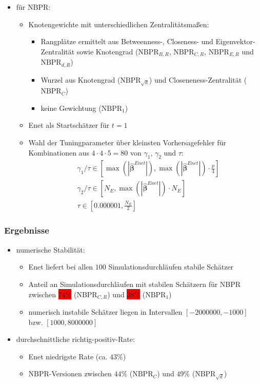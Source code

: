 \documentclass{beamer}
\begin{document}
\begin{frame}
	\begin{itemize}
	\item für $\text{NBPR}$:
	\begin{itemize}
	\item Knotengewichte mit unterschiedlichen Zentralitätsmaßen:
	\begin{itemize}
	\item Rangplätze ermittelt aus Betweenness-, Closeness- und Eigenvektor-Zentralität sowie Knotengrad ($\text{NBPR}_{B,R}$, $\text{NBPR}_{C,R}$, $\text{NBPR}_{E,R}$ und $\text{NBPR}_{d,R}$)
	\item Wurzel aus Knotengrad ($\text{NBPR}_{\sqrt{d}}$) und Closeneness-Zentralität ($\text{NBPR}_{C}$)
	\item keine Gewichtung ($\text{NBPR}_{1}$)
	\end{itemize}
	\item Enet als Startschätzer für $t=1$
	\item Wahl der Tuningparameter über kleinsten Vorhersagefehler für Kombinationen aus $4\cdot 4 \cdot 5 =80$ von $\gamma_1$, $\gamma_2$ und $\tau$:
	\begin{align*}
	&\gamma_1/\tau \in \left[ \max(|\boldsymbol{\hat{\beta}}^{Enet}|), \max(|\boldsymbol{\hat{\beta}}^{Enet}|) \cdot \frac{p}{4} \right] \\
	&\gamma_2/\tau \in \left[ N_E, \max(|\boldsymbol{\hat{\beta}}^{Enet}|) \cdot N_E \right]\\
	&\tau \in \left[0.000001, \frac{N_E}{2}\right]
	\end{align*}
	\end{itemize}
	\end{itemize}
\end{frame}


\begin{frame}
	\frametitle{Ergebnisse}
	\begin{itemize}
	\item numerische Stabilität:
	\begin{itemize}
	\item Enet liefert bei allen $100$ Simulationsdurchläufen stabile Schätzer
	\item Anteil an Simulationsdurchläufen mit stabilen Schätzern für NBPR zwischen \colorbox{red}{$74\%$} ($\text{NBPR}_{C,R}$) und \colorbox{red}{$38\%$} ($\text{NBPR}_{1}$)
	\item numerisch instabile Schätzer liegen in Intervallen $[-2000000,-1000]$ bzw. $[1000,8000000]$
	\end{itemize}
	\item durchschnittliche richtig-positiv-Rate:
	\begin{itemize}
	\item Enet niedrigste Rate (ca. $43\%$)
	\item NBPR-Versionen zwischen $44\%$ ($\text{NBPR}_{C}$) und $49\%$ ($\text{NBPR}_{\sqrt{d}}$)
	\end{itemize}
	\end{itemize}
\end{frame}
\end{document}
